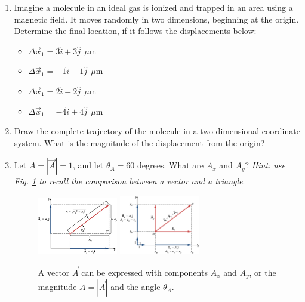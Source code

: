\documentclass{article}
\begin{document}
\begin{enumerate}
\item Imagine a molecule in an ideal gas is ionized and trapped in an area using a magnetic field.  It moves randomly in two dimensions, beginning at the origin.  Determine the final location, if it follows the displacements below:
\begin{itemize}
\item $\Delta\vec{x}_1 = 3\hat{i}+3\hat{j} ~~ \mu$m
\item $\Delta\vec{x}_1 = -1\hat{i}-1\hat{j} ~~ \mu$m
\item $\Delta\vec{x}_1 = 2\hat{i}-2\hat{j} ~~ \mu$m
\item $\Delta\vec{x}_1 = -4\hat{i}+4\hat{j} ~~ \mu$m
\end{itemize}
\item Draw the complete trajectory of the molecule in a two-dimensional coordinate system.  What is the magnitude of the displacement from the origin? \\ \vspace{2cm}
\item Let $A = |\vec{A}| = 1$, and let $\theta_A = 60$ degrees.  What are $A_x$ and $A_y$?  \textit{Hint: use Fig. \ref{fig:1} to recall the comparison between a vector and a triangle}.
\begin{figure}[hb]
\centering
\includegraphics[width=0.33\textwidth]{vector1.jpeg} \hspace{0.5cm}
\includegraphics[width=0.33\textwidth]{vector2.jpeg}
\caption{\label{fig:1} A vector $\vec{A}$ can be expressed with components $A_x$ and $A_y$, or the magnitude $A = |\vec{A}|$ and the angle $\theta_A$.}
\end{figure}
\end{enumerate}
\end{document}
